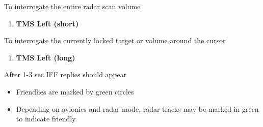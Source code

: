 \begin{checklistenumerate}
    \smallskip
    To interrogate the entire radar scan volume

    \begin{enumerate}
        \item \textbf{TMS} \dotfill \textbf{Left (short)}
    \end{enumerate}

    To interrogate the currently locked target or volume around the cursor 

    \begin{enumerate}
        \item \textbf{TMS} \dotfill \textbf{Left (long)}
    \end{enumerate}
    After 1-3 sec IFF replies should appear

    \begin{itemize}
        \item Friendlies are marked by green circles
        \item Depending on avionics and radar mode, radar tracks may be marked in green to indicate friendly
    \end{itemize}
\end{checklistenumerate}

\marginfigrestore